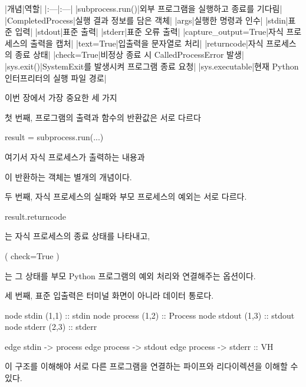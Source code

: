 \begin{dhktable}
|개념|역할|
|:---|:---|
|subprocess.run()|외부 프로그램을 실행하고 종료를 기다림|
|CompletedProcess|실행 결과 정보를 담은 객체|
|args|실행한 명령과 인수|
|stdin|표준 입력|
|stdout|표준 출력|
|stderr|표준 오류 출력|
|capture_output=True|자식 프로세스의 출력을 캡처|
|text=True|입출력을 문자열로 처리|
|returncode|자식 프로세스의 종료 상태|
|check=True|비정상 종료 시 CalledProcessError 발생|
|sys.exit()|SystemExit를 발생시켜 프로그램 종료 요청|
|sys.executable|현재 Python 인터프리터의 실행 파일 경로|
\end{dhktable}

\begin{dhknote}
\begin{dhksmry}[centered]
이번 장에서 가장 중요한 세 가지
\end{dhksmry}
\end{dhknote}

첫 번째, 프로그램의 출력과 함수의 반환값은 서로 다르다

\begin{dhkcode}
result = subprocess.run(...)
\end{dhkcode}

여기서 자식 프로세스가 출력하는 내용과

이 반환하는  객체는 별개의 개념이다.

두 번째, 자식 프로세스의 실패와 부모 프로세스의 예외는 서로 다르다.

\begin{dhkcode}
result.returncode
\end{dhkcode}

는 자식 프로세스의 종료 상태를 나타내고,

\begin{dhkcode}
(
    check=True
)
\end{dhkcode}

는 그 상태를 부모 Python 프로그램의 예외 처리와 연결해주는 옵션이다.

세 번째, 표준 입출력은 터미널 화면이 아니라 데이터 통로다.

\begin{dhkdiagram}
node stdin (1,1) :: stdin
node process (1,2) :: Process
node stdout (1,3) :: stdout
node stderr (2,3) :: stderr

edge stdin -> process
edge process -> stdout
edge process -> stderr :: VH
\end{dhkdiagram}

이 구조를 이해해야 서로 다른 프로그램을 연결하는 파이프와 리다이렉션을 이해할 수 있다.

